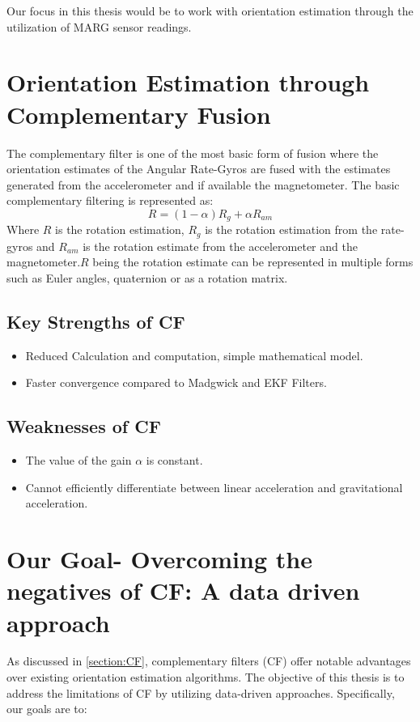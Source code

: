 \documentclass{iutbscthesis}
\begin{document}
Our focus in this thesis would be to work with orientation estimation through the utilization of
MARG sensor readings.

\section{Orientation Estimation through Complementary Fusion}\label{section:CF}

The complementary filter is one of the most basic form of fusion where the orientation estimates of the Angular Rate-Gyros are fused with the estimates generated from the accelerometer and if available the magnetometer.
The basic complementary filtering\cite{forbes2015fundamentals}\cite{euston2008complementary} is represented as:
\begin{equation}
    R = (1-\alpha)R_g + \alpha R_{am}
\end{equation}
Where $R$ is the rotation estimation, $R_g$ is the rotation estimation from the 
rate-gyros and $R_{am}$ is the rotation estimate from the accelerometer 
and the magnetometer.$R$ being the rotation estimate can be represented in multiple forms
such as Euler angles, quaternion or as a rotation matrix.
\par
\subsection{Key Strengths of CF}
\begin{itemize}
    \item Reduced Calculation and computation, simple mathematical model.
    \item Faster convergence compared to Madgwick and EKF Filters\cite{valenti2015keeping}.
\end{itemize}
\subsection{Weaknesses of CF}
\begin{itemize}
    \item The value of the gain $\alpha$ is constant.
    \item Cannot efficiently differentiate between linear acceleration and gravitational acceleration.
\end{itemize}


\section{Our Goal- Overcoming the negatives of CF: A data driven approach}
\par
As discussed in \autoref{section:CF}, complementary filters (CF) offer notable 
advantages over existing orientation estimation algorithms. 
The objective of this thesis is to address the limitations of CF by utilizing data-driven approaches. Specifically, our goals are to:
\end{document}
